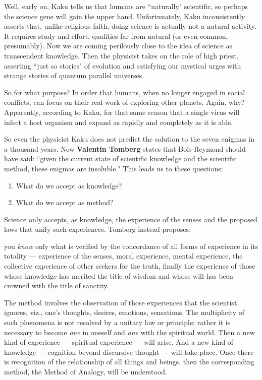 Well, early on, Kaku tells us that humans are ``naturally" scientific, so perhaps the science gene will gain the upper
hand. Unfortunately, Kaku inconsistently asserts that, unlike religious faith, doing science is actually not a natural
activity. It requires study and effort, qualities far from natural (or even common, presumably). Now we are coming
perilously close to the idea of science as transcendent knowledge. Then the physicist takes on the role of high priest,
asserting ``just so stories" of evolution and satisfying our mystical urges with strange stories of quantum parallel
universes.

So for what purpose? In order that humans, when no longer engaged in social conflicts, can focus on their real work of
exploring other planets. Again, why? Apparently, according to Kaku, for that same reason that a single virus will
infect a host organism and expand as rapidly and completely as it is able.

So even the physicist Kaku does not predict the solution to the seven enigmas in a thousand years. Now \textbf{Valentin Tomberg} states that Bois-Reymond should have said: ``given the current state of scientific knowledge and the scientific
method, these enigmas are insoluble." This leads us to these questions:

\begin{enumerate}
\item What do we accept as knowledge? 
\item What do we accept as method? 
\end{enumerate}
Science only accepts, as knowledge, the experience of the senses and the proposed laws that unify such experiences.
Tomberg instead proposes:

\begin{quotex}
you \emph{know} only what is verified by the concordance of all forms of experience in its totality
— experience of the senses, moral experience, mental experience, the collective experience of
other seekers for the truth, finally the experience of those whose knowledge has merited the title of wisdom and whose
will has been crowned with the title of sanctity. 

\end{quotex}
The method involves the observation of those experiences that the scientist ignores, viz., one's
thoughts, desires, emotions, sensations. The multiplicity of such phenomena is not resolved by a unitary law or
principle; rather it is necessary to become \emph{one} in oneself and \emph{one} with the spiritual world. Then a new
kind of experience — spiritual experience — will arise. And a new kind of
knowledge — cognition beyond discursive thought — will take place. Once there
is recognition of the relationship of all things and beings, then the corresponding method, the Method of Analogy, will
be understood.


